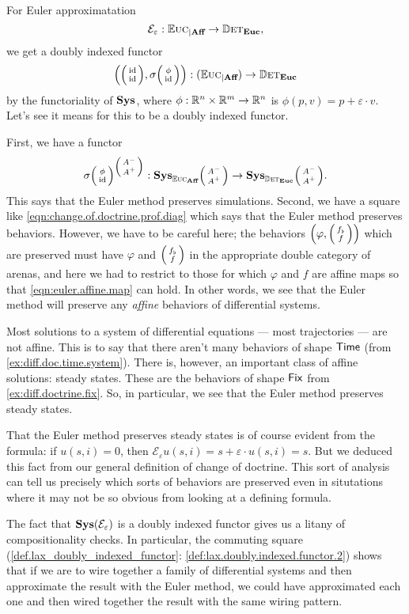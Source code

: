\documentclass[DynamicalBook]{subfiles}
\begin{document}
\begin{example}
For Euler approximatation 
  \[
\mathcal{E}_{\varepsilon} : \mathbb{E}\textsc{uc}_{|\textbf{Aff}} \to \mathbb{D}\textsc{et}_{\textbf{Euc}},
  \]
  we get a doubly indexed functor
  $$\left(\littlelens{\id}{\id}, \sigma\littlelens{\phi}{\id}\right) : \Sys(\eucdiff_{|\textbf{Aff}}) \to \determ_{\Cat{Euc}}$$
  by the functoriality of $\textbf{Sys}$, where $\phi : \mathbb{R}^n \times \mathbb{R}^m \to
  \mathbb{R}^n$ is $\phi(p, v) = p + \varepsilon \cdot v$. Let's see it means for this
  to be a doubly indexed functor.

  First, we have a functor
  \[
    \sigma\littlelens{\phi}{\id}^{\littlelens{A^-}{A^+}} :
    \Cat{Sys}_{\eucdiff_{\textbf{Aff}}}\littlelens{A^-}{A^+} \to \Cat{Sys}_{\determ_{\Cat{Euc}}}\littlelens{A^-}{A^+}.
  \]
  This says that the Euler method preserves simulations. Second, we have a
  square like \cref{eqn:change.of.doctrine.prof.diag} which says that the Euler
  method preserves behaviors. However, we have to be careful here; the behaviors
  $\left( \varphi, \lens{f_{\flat}}{f} \right)$ which are preserved must have
$\varphi$ and $\lens{f_{\flat}}{f}$ in the appropriate double category of arenas, and here
  we had to restrict to those for which $\varphi$ and $f$ are affine maps so
  that \cref{eqn:euler.affine.map} can hold. In other words, we see that the
  Euler method will preserve any \emph{affine} behaviors of differential systems.

  Most solutions to a system of differential equations --- most trajectories ---
  are not affine. This is to say that
  there aren't many behaviors of shape $\mathsf{Time}$ (from
  \cref{ex:diff.doc.time.system}). There is, however, an important class of
  affine solutions: steady states. These are the behaviors of shape $\mathsf{Fix}$
  from \cref{ex:diff.doctrine.fix}. So, in particular, we see that the Euler
  method preserves steady states.

  That the Euler method preserves steady states is of course evident from the
  formula: if $u(s, i) = 0$, then $\mathcal{E}_{\varepsilon}u(s, i) = s +
  \varepsilon \cdot u(s, i) = s$. But we deduced this fact from our general
  definition of change of doctrine. This sort of analysis can tell us precisely
  which sorts of behaviors are preserved even in situtations where it may not be
  so obvious from looking at a defining formula.

  The fact that $\textbf{Sys}(\mathcal{E}_{\varepsilon})$ is a doubly indexed
  functor gives us a litany of compositionality checks. In particular, the
  commuting square (\cref{def.lax_doubly_indexed_functor}:
  \cref{def:lax.doubly.indexed.functor.2}) shows
  that if we are to wire together a family of differential systems and then
  approximate the result with the Euler method, we could have approximated each
  one and then wired together the result with the same wiring pattern.


  
\end{example}
\end{document}
